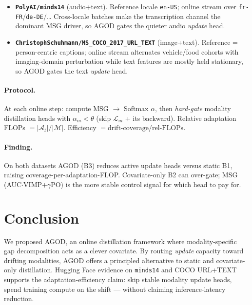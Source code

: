 \documentclass[11pt]{article}
\begin{document}
\begin{itemize}
    \item \textbf{\texttt{PolyAI/minds14}} (audio+text). Reference locale \texttt{en-US}; online stream over \texttt{fr-FR}/\texttt{de-DE}/\ldots{} Cross-locale batches make the transcription channel the dominant MSG driver, so AGOD gates the quieter audio \emph{update} head.
    \item \textbf{\texttt{ChristophSchuhmann/MS\_COCO\_2017\_URL\_TEXT}} (image+text). Reference = person-centric captions; online stream alternates vehicle/food cohorts with imaging-domain perturbation while text features are mostly held stationary, so AGOD gates the text \emph{update} head.
\end{itemize}

\paragraph{Protocol.} At each online step: compute MSG $\rightarrow$ Softmax $\alpha$, then \emph{hard-gate} modality distillation heads with $\alpha_m < \theta$ (skip \(\mathcal{L}_m\) + its backward). Relative adaptation FLOPs $= |\mathcal{A}_t|/|\mathcal{M}|$. Efficiency $= \text{drift-coverage}/\text{rel-FLOPs}$.

\paragraph{Finding.} On both datasets AGOD (B3) reduces active update heads versus static B1, raising coverage-per-adaptation-FLOP. Covariate-only B2 can over-gate; MSG (AUC$\cdot$VIMP+$γ$PO) is the more stable control signal for which head to pay for.

\section{Conclusion}
We proposed AGOD, an online distillation framework where modality-specific gap decomposition acts as a clever covariate. By routing \emph{update} capacity toward drifting modalities, AGOD offers a principled alternative to static and covariate-only distillation. Hugging Face evidence on \texttt{minds14} and COCO URL+TEXT supports the adaptation-efficiency claim: skip stable modality update heads, spend training compute on the shift --- without claiming inference-latency reduction.
\end{document}

